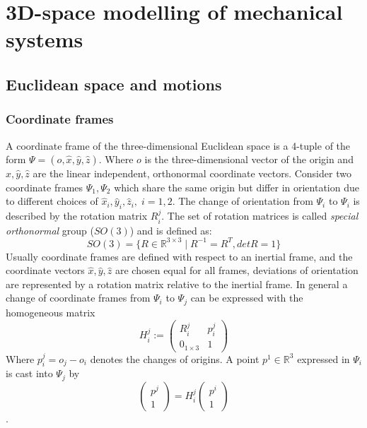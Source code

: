 \documentclass[a4paper,twoside, openright,12pt]{report}
\begin{document}
\section{3D-space modelling of mechanical systems}


\subsection{Euclidean space and motions}\label{[SS:euclideanspacemotions]}
\subsubsection{Coordinate frames}
A coordinate frame of the three-dimensional Euclidean space is a 4-tuple of the form $ \Psi = (o,\hat{x},\hat{y},\hat{z})$. Where $ o $ is the three-dimensional vector of the origin and $ \hat{x},\hat{y},\hat{z} $ are the linear independent, orthonormal coordinate vectors. Consider two coordinate frames $ \Psi_1,\Psi_2 $ which share the same origin but differ in orientation due to different choices of $ \hat{x}_i,\hat{y}_i,\hat{z}_i, \; i=1,2 $. The change of orientation from $ \Psi_i $ to $ \Psi_i $ is described by the rotation matrix $ R_i^j $. The set of rotation matrices is called \emph{special orthonormal} group ($SO(3)$) \cite{Stramigioli_01b} and is defined as:
\begin{equation}
	SO(3) = \{R \in \mathbb{R}^{3 \times 3} \; | \; R^{-1} = R^T, det R = 1\}
\end{equation}
Usually coordinate frames are defined with respect to an inertial frame, and the coordinate vectors $ \hat{x},\hat{y},\hat{z} $ are chosen equal for all frames, deviations of orientation are represented by a rotation matrix relative to the inertial frame. In general a change of coordinate frames from $ \Psi_i $ to $ \Psi_j $ can be expressed with the homogeneous matrix
\[ H_i^j := \begin{pmatrix}R_i^j & p_i^j \\ 0_{1\times3} & 1\end{pmatrix} \]
Where $p_i^j = o_j - o_i$ denotes the changes of origins. A point $ p^1 \in \mathbb{R}^3 $ expressed in $ \Psi_i $ is cast into $\Psi_j$ by
\begin{equation}\label{EQ:coordchange}
	\begin{pmatrix}p^j \\ 1\end{pmatrix} = H_i^j \begin{pmatrix}
		p^i \\ 1\end{pmatrix}
\end{equation}.
\end{document}
